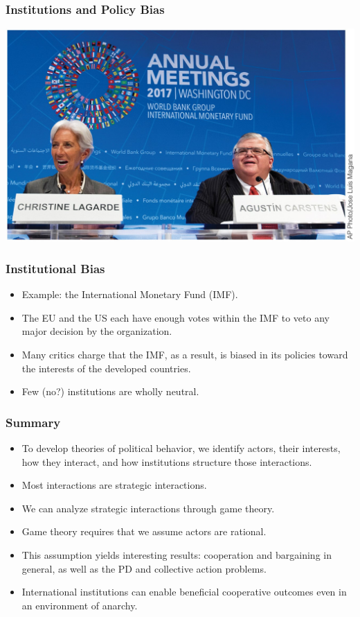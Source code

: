 \documentclass{beamer}
\begin{document}
\begin{frame} 
	\frametitle{\LARGE{Institutions and Policy Bias}}	
	\centering
	\includegraphics[width=\textwidth,height=0.9\textheight,keepaspectratio]{IMF2017.jpg}
\end{frame}

\begin{frame} 
	\frametitle{\LARGE{Institutional Bias}}	

	\begin{itemize}
		\item Example: the International Monetary Fund (IMF).
		\item The EU and the US each have enough votes within the IMF to veto any major decision by the organization. \pause
		\item Many critics charge that the IMF, as a result, is biased in its policies toward the interests of the developed countries. \pause
		\item Few (no?) institutions are wholly neutral.
	\end{itemize}

\end{frame}

\begin{frame} 
\frametitle{\LARGE{Summary}}
    \begin{itemize}
    	\item To develop theories of political behavior, we identify actors, their interests, how they interact, and how institutions structure those interactions. \pause
    	\item Most interactions are strategic interactions. \pause
    	\item We can analyze strategic interactions through game theory. \pause
    	\item Game theory requires that we assume actors are rational. \pause
    	\item This assumption yields interesting results: cooperation and bargaining in general, as well as the PD and collective action problems. \pause
    	\item International institutions can enable beneficial cooperative outcomes even in an environment of anarchy.         
    \end{itemize}
\end{frame}
\end{document}

